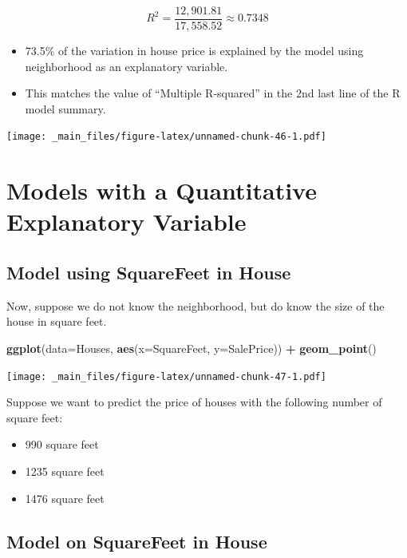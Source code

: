 \documentclass[]{book}
\newenvironment{Shaded}{\begin{snugshade}}{\end{snugshade}}
\newcommand{\KeywordTok}[1]{\textcolor[rgb]{0.13,0.29,0.53}{\textbf{#1}}}
\newcommand{\DataTypeTok}[1]{\textcolor[rgb]{0.13,0.29,0.53}{#1}}
\newcommand{\StringTok}[1]{\textcolor[rgb]{0.31,0.60,0.02}{#1}}
\newcommand{\OperatorTok}[1]{\textcolor[rgb]{0.81,0.36,0.00}{\textbf{#1}}}
\newcommand{\NormalTok}[1]{#1}
\providecommand{\tightlist}{%
  \setlength{\itemsep}{0pt}\setlength{\parskip}{0pt}}
\begin{document}
\[ R^2= \frac{12,901.81}{17,558.52}\approx0.7348 \]

\begin{itemize}
\item
  73.5\% of the variation in house price is explained by the model using
  neighborhood as an explanatory variable.
\item
  This matches the value of ``Multiple R-squared'' in the 2nd last line
  of the R model summary.
\end{itemize}

\texttt{[image: \_main\_files/figure-latex/unnamed-chunk-46-1.pdf]}

\section{Models with a Quantitative Explanatory
Variable}\label{models-with-a-quantitative-explanatory-variable}

\subsection{Model using SquareFeet in
House}\label{model-using-squarefeet-in-house}

Now, suppose we do not know the neighborhood, but do know the size of
the house in square feet.

\begin{Shaded}
\begin{Highlighting}[]
\KeywordTok{ggplot}\NormalTok{(}\DataTypeTok{data=}\NormalTok{Houses, }\KeywordTok{aes}\NormalTok{(}\DataTypeTok{x=}\NormalTok{SquareFeet, }\DataTypeTok{y=}\NormalTok{SalePrice)) }\OperatorTok{+}\StringTok{ }\KeywordTok{geom_point}\NormalTok{() }
\end{Highlighting}
\end{Shaded}

\texttt{[image: \_main\_files/figure-latex/unnamed-chunk-47-1.pdf]}

Suppose we want to predict the price of houses with the following number
of square feet:

\begin{itemize}
\tightlist
\item
  990 square feet\\
\item
  1235 square feet\\
\item
  1476 square feet
\end{itemize}

\subsection{Model on SquareFeet in
House}\label{model-on-squarefeet-in-house}
\end{document}
